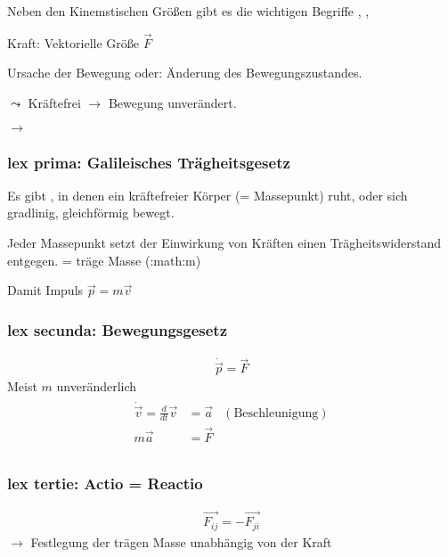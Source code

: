 \documentclass[a4paper,10pt,ngerman]{sphinxmanual}
\begin{document}
Neben den Kinemstischen Größen gibt es die wichtigen Begriffe
, , 

Kraft: Vektorielle Größe \(\vec{F}\)

Ursache der Bewegung oder: Änderung des Bewegungszustandes.

\(\leadsto\) Kräftefrei \(\rightarrow\) Bewegung unverändert.

\(\rightarrow\) 


\subsubsection{lex prima: Galileisches Trägheitsgesetz}
\label{\detokenize{klassischemechanik:lex-prima-galileisches-tragheitsgesetz}}
Es gibt , in denen ein kräftefreier Körper
(= Massepunkt) ruht, oder sich gradlinig, gleichförmig bewegt.

 Jeder Massepunkt setzt der Einwirkung von
Kräften einen Trägheitswiderstand entgegen. = träge Masse (:math:m)

Damit Impuls \(\vec{p}=m\vec{v}\)


\subsubsection{lex secunda: Bewegungsgesetz}
\label{\detokenize{klassischemechanik:lex-secunda-bewegungsgesetz}}\begin{equation*}
\begin{split}\dot{\vec{p}} = \vec{F}\end{split}
\end{equation*}
Meist \(m\) unveränderlich
\begin{align*}\!\begin{aligned}
\dot{\vec{v}} = \frac{d}{dt}\vec{v} &= \vec{a} & \mathrm{(Beschleunigung)}\\
m\vec{a} &= \vec{F}\\
\end{aligned}\end{align*}

\subsubsection{lex tertie: Actio = Reactio}
\label{\detokenize{klassischemechanik:lex-tertie-actio-reactio}}\begin{equation*}
\begin{split}\vec{F_{ij}} = - \vec{F_{ji}}\end{split}
\end{equation*}
\(\rightarrow\) Festlegung der trägen Masse unabhängig von
der Kraft
\end{document}
